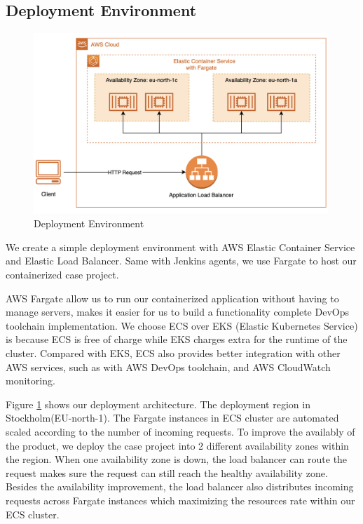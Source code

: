 \subsection{Deployment Environment}
\begin{figure}[h]
    \centering
    \includegraphics[width=0.99\textwidth]{pics/deploy.png}
    \caption{Deployment Environment}
    \label{fig:deploy}
\end{figure}
We create a simple deployment environment with AWS Elastic Container Service and Elastic Load Balancer. Same with Jenkins agents, we use Fargate to host our containerized case project. 
\par
AWS Fargate allow us to run our containerized application without having to manage servers, makes it easier for us to build a functionality complete DevOps toolchain implementation. We choose ECS over EKS (Elastic Kubernetes Service) is because ECS is free of charge while EKS charges extra for the runtime of the cluster. Compared with EKS, ECS also provides better integration with other AWS services, such as with AWS DevOps toolchain, and AWS CloudWatch monitoring.
\par
Figure \ref{fig:deploy}
shows our deployment architecture. The deployment region in Stockholm(EU-north-1). The Fargate instances in ECS cluster are automated scaled according to the number of incoming requests. 
To improve the availably of the product, we deploy the case project into 2 different availability zones within the region. 
When one availability zone is down, the load balancer can route the request makes sure the request can still reach the healthy availability zone. Besides the availability improvement, the load balancer also distributes incoming requests across Fargate instances which maximizing the resources rate within our ECS cluster.
